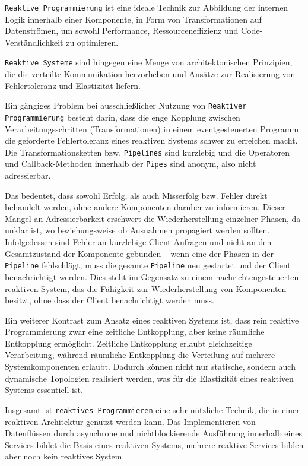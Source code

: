 \verb|Reaktive Programmierung| ist eine ideale Technik zur Abbildung der internen Logik innerhalb einer Komponente, in Form von Transformationen
auf Datenströmen, um sowohl Performance, Ressourceneffizienz und Code-Verständlichkeit zu optimieren.

\verb|Reaktive Systeme| sind hingegen eine Menge von architektonischen Prinzipien, die die verteilte Kommunikation hervorheben und
Ansätze zur Realisierung von Fehlertoleranz und Elastizität liefern.

Ein gängiges Problem bei ausschließlicher Nutzung von \verb|Reaktiver Programmierung| besteht darin, dass die enge Kopplung
zwischen Verarbeitungsschritten (Transformationen) in einem eventgesteuerten Programm die geforderte Fehlertoleranz eines reaktiven Systems
schwer zu erreichen macht.
Die Transformationsketten bzw. \verb|Pipelines| sind kurzlebig und die Operatoren und Callback-Methoden innerhalb der \verb|Pipes|
sind anonym, also nicht adressierbar.

Das bedeutet, dass sowohl Erfolg, als auch Misserfolg bzw. Fehler direkt behandelt werden, ohne andere Komponenten darüber zu informieren.
Dieser Mangel an Adressierbarkeit erschwert die Wiederherstellung einzelner Phasen, da unklar ist, wo beziehungsweise ob Ausnahmen
propagiert werden sollten. Infolgedessen sind Fehler an kurzlebige Client-Anfragen und nicht an den
Gesamtzustand der Komponente gebunden – wenn eine der Phasen in der \verb|Pipeline| fehlschlägt, muss die gesamte \verb|Pipeline| neu
gestartet und der Client benachrichtigt werden. Dies steht im Gegensatz zu einem nachrichtengesteuerten reaktiven System, das
die Fähigkeit zur Wiederherstellung von Komponenten besitzt, ohne dass der Client benachrichtigt werden muss.

Ein weiterer Kontrast zum Ansatz eines reaktiven Systems ist, dass rein reaktive Programmierung zwar eine zeitliche Entkopplung,
aber keine räumliche Entkopplung ermöglicht. Zeitliche Entkopplung erlaubt gleichzeitige Verarbeitung, während räumliche Entkopplung
die Verteilung auf mehrere Systemkomponenten erlaubt. Dadurch können nicht nur statische, sondern auch dynamische Topologien
realisiert werden, was für die Elastizität eines reaktiven Systems essentiell ist.

Insgesamt ist \verb|reaktives Programmieren| eine sehr nützliche Technik, die in einer reaktiven Architektur genutzt werden kann.
Das Implementieren von Datenflüssen durch asynchrone und nichtblockierende Ausführung innerhalb eines Services bildet
die Basis eines reaktiven Systems, mehrere reaktive Services bilden aber noch kein reaktives System.

